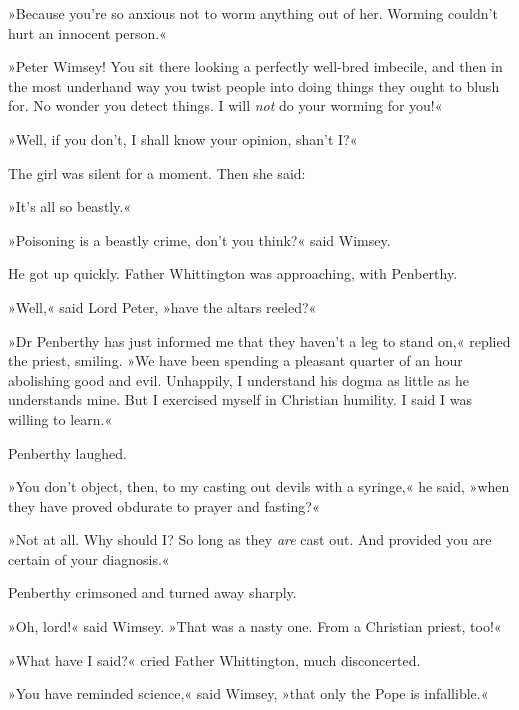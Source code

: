 »Because you're so anxious not to worm anything out of her. Worming couldn't hurt an innocent person.«

»Peter Wimsey! You sit there looking a perfectly well-bred imbecile, and then in the most underhand way you twist people into doing things they ought to blush for. No wonder you detect things. I will \textit{not} do your worming for you!«

»Well, if you don't, I shall know your opinion, shan't I?«

The girl was silent for a moment. Then she said:

»It's all so beastly.«

»Poisoning is a beastly crime, don't you think?« said Wimsey.

He got up quickly. Father Whittington was approaching, with Penberthy.

»Well,« said Lord Peter, »have the altars reeled?«

»Dr Penberthy has just informed me that they haven't a leg to stand on,« replied the priest, smiling. »We have been spending a pleasant quarter of an hour abolishing good and evil. Unhappily, I understand his dogma as little as he understands mine. But I exercised myself in Christian humility. I said I was willing to learn.«

Penberthy laughed.

»You don't object, then, to my casting out devils with a syringe,« he said, »when they have proved obdurate to prayer and fasting?«

»Not at all. Why should I? So long as they \textit{are} cast out. And provided you are certain of your diagnosis.«

Penberthy crimsoned and turned away sharply.

»Oh, lord!« said Wimsey. »That was a nasty one. From a Christian priest, too!«

»What have I said?« cried Father Whittington, much disconcerted.

»You have reminded science,« said Wimsey, »that only the Pope is infallible.«